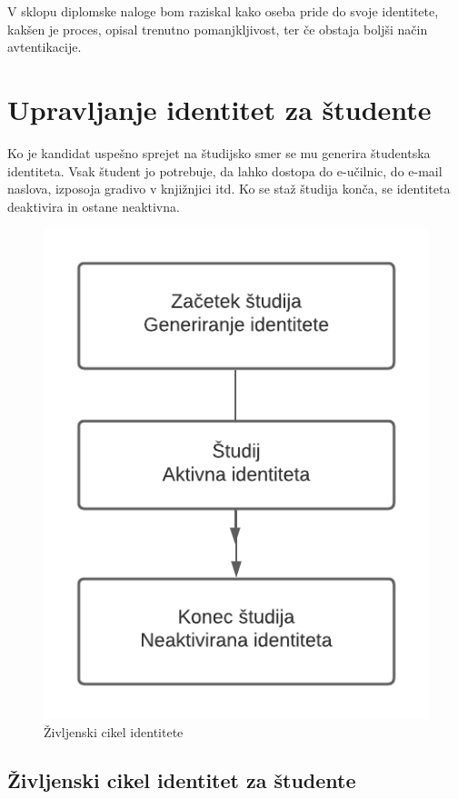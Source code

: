 \documentclass[a4paper,12pt,openright]{book}
\begin{document}
{V sklopu diplomske naloge bom raziskal kako oseba pride do svoje identitete, kakšen je proces, opisal trenutno pomanjkljivost, ter če obstaja boljši način avtentikacije.

\chapter{Upravljanje identitet za študente}

Ko je kandidat uspešno sprejet na študijsko smer se mu generira študentska identiteta. Vsak študent jo potrebuje, da lahko dostopa do e-učilnic, do e-mail naslova, izposoja gradivo v knjižnjici itd. \newline
Ko se staž študija konča, se identiteta deaktivira in ostane neaktivna.

\begin{figure}[]
\includegraphics[]{diploma-FRI-vzorec_11maj2021/Blank diagram.png}
\caption{Življenski cikel identitete}
\label{fig:IDlife}
\end{figure}


\section{Življenski cikel identitet za študente}

}
\end{document}
